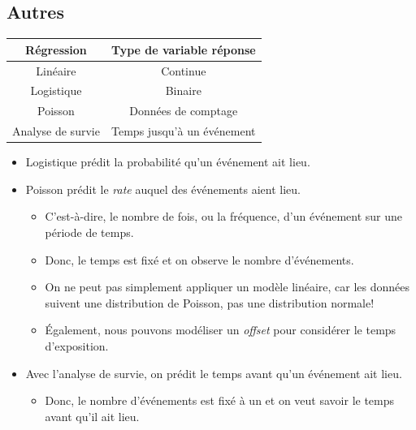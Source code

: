 \documentclass[french]{article}
\begin{document}
\begin{multicols*}{2}
\section{Autres}
\begin{tabular}{|	c	|	c	|}
Régression	&	Type de variable réponse	\\\hline
Linéaire		&	Continue	\\
Logistique	&	Binaire	\\
Poisson		&	Données de comptage	\\
Analyse de survie	&	Temps jusqu'à un événement	\\
\end{tabular}
\begin{itemize}
	\item	Logistique prédit la probabilité qu'un événement ait lieu.
	\item	Poisson prédit le \og \textit{rate} \fg{} auquel des événements aient lieu.
		\begin{itemize}
		\item	C'est-à-dire, le nombre de fois, ou la fréquence, d'un événement sur une période de temps.
		\item	Donc, le temps est fixé et on observe le nombre d'événements.
		\item	On ne peut pas simplement appliquer un modèle linéaire, car les données suivent une distribution de Poisson, pas une distribution normale! 
		\item	Également, nous pouvons modéliser un \og \textit{offset} \fg{} pour considérer le temps d'exposition.
		\end{itemize}
	\item	Avec l'analyse de survie, on prédit le temps avant qu'un événement ait lieu.
		\begin{itemize}
		\item	Donc, le nombre d'événements est fixé à un et on veut savoir le temps avant qu'il ait lieu.
		\end{itemize}
\end{itemize}


\end{multicols*}
\end{document}
